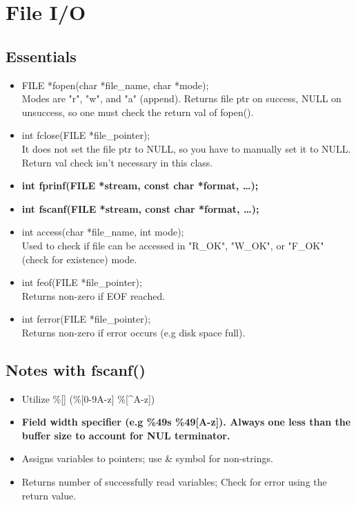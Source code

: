 \documentclass{article}
\begin{document}
\section{File I/O}

\subsection{Essentials}
\begin{itemize}
    \item FILE *fopen(char *file\_name, char *mode);\\
    Modes are "r", "w", and "a" (append). Returns file ptr on success, NULL on unsuccess, so one must check the return val of fopen().
    \item int fclose(FILE *file\_pointer);\\
    It does not set the file ptr to NULL, so you have to manually set it to NULL. Return val check isn't necessary in this class.
    \item \textbf{int fprinf(FILE *stream, const char *format, \dots);}
    \item \textbf{int fscanf(FILE *stream, const char *format, \dots);}
    \item int access(char *file\_name, int mode);\\
    Used to check if file can be accessed in "R\_OK", "W\_OK", or "F\_OK" (check for existence) mode.
    \item int feof(FILE *file\_pointer);\\
    Returns non-zero if EOF reached.
    \item int ferror(FILE *file\_pointer);\\
    Returns non-zero if error occurs (e.g disk space full).
\end{itemize}

\subsection{Notes with fscanf()}
\begin{itemize}
    \item Utilize \%[] (\%[0-9A-z] \%[\^{}A-z])
    \item \textbf{Field width specifier (e.g \%49s \%49[A-z]). Always one less than the buffer size to account for NUL terminator.}
    \item Assigns variables to pointers; use \& symbol for non-strings.
    \item Returns number of successfully read variables; Check for error using the return value.
\end{itemize}
\end{document}
